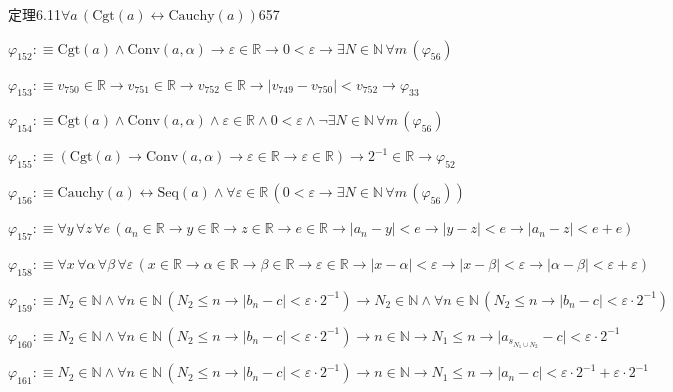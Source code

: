 \begin{fullproof}{定理6.11}{$\forall a\,(\mathrm{Cgt}(a) \leftrightarrow \mathrm{Cauchy}(a))$}{657}
\begin{abbrevlist}
\item $\varphi_{152} :\equiv \mathrm{Cgt}(a) \land \mathrm{Conv}(a,\alpha) \to \varepsilon \in \mathbb{R} \to 0 < \varepsilon \to \exists N \in \mathbb{N}\,\forall m\,(\varphi_{56})$
\item $\varphi_{153} :\equiv v_{750} \in \mathbb{R} \to v_{751} \in \mathbb{R} \to v_{752} \in \mathbb{R} \to \lvert v_{749} - v_{750} \rvert < v_{752} \to \varphi_{33}$
\item $\varphi_{154} :\equiv \mathrm{Cgt}(a) \land \mathrm{Conv}(a,\alpha) \land \varepsilon \in \mathbb{R} \land 0 < \varepsilon \land \neg \exists N \in \mathbb{N}\,\forall m\,(\varphi_{56})$
\item $\varphi_{155} :\equiv (\mathrm{Cgt}(a) \to \mathrm{Conv}(a,\alpha) \to \varepsilon \in \mathbb{R} \to \varepsilon \in \mathbb{R}) \to 2^{-1} \in \mathbb{R} \to \varphi_{52}$
\item $\varphi_{156} :\equiv \mathrm{Cauchy}(a) \leftrightarrow \mathrm{Seq}(a) \land \forall \varepsilon \in \mathbb{R}\,(0 < \varepsilon \to \exists N \in \mathbb{N}\,\forall m\,(\varphi_{56}))$
\item $\varphi_{157} :\equiv \forall y\,\forall z\,\forall e\,(a_{n} \in \mathbb{R} \to y \in \mathbb{R} \to z \in \mathbb{R} \to e \in \mathbb{R} \to \lvert a_{n} - y \rvert < e \to \lvert y - z \rvert < e \to \lvert a_{n} - z \rvert < e + e)$
\item $\varphi_{158} :\equiv \forall x\,\forall \alpha\,\forall \beta\,\forall \varepsilon\,(x \in \mathbb{R} \to \alpha \in \mathbb{R} \to \beta \in \mathbb{R} \to \varepsilon \in \mathbb{R} \to \lvert x - \alpha \rvert < \varepsilon \to \lvert x - \beta \rvert < \varepsilon \to \lvert \alpha - \beta \rvert < \varepsilon + \varepsilon)$
\item $\varphi_{159} :\equiv N_{2} \in \mathbb{N} \land \forall n \in \mathbb{N}\,(N_{2} \leq n \to \lvert b_{n} - c \rvert < \varepsilon \cdot 2^{-1}) \to N_{2} \in \mathbb{N} \land \forall n \in \mathbb{N}\,(N_{2} \leq n \to \lvert b_{n} - c \rvert < \varepsilon \cdot 2^{-1})$
\item $\varphi_{160} :\equiv N_{2} \in \mathbb{N} \land \forall n \in \mathbb{N}\,(N_{2} \leq n \to \lvert b_{n} - c \rvert < \varepsilon \cdot 2^{-1}) \to n \in \mathbb{N} \to N_{1} \leq n \to \lvert a_{s_{N_{1} \cup N_{2}}} - c \rvert < \varepsilon \cdot 2^{-1}$
\item $\varphi_{161} :\equiv N_{2} \in \mathbb{N} \land \forall n \in \mathbb{N}\,(N_{2} \leq n \to \lvert b_{n} - c \rvert < \varepsilon \cdot 2^{-1}) \to n \in \mathbb{N} \to N_{1} \leq n \to \lvert a_{n} - c \rvert < \varepsilon \cdot 2^{-1} + \varepsilon \cdot 2^{-1}$

\end{abbrevlist}
\end{fullproof}
